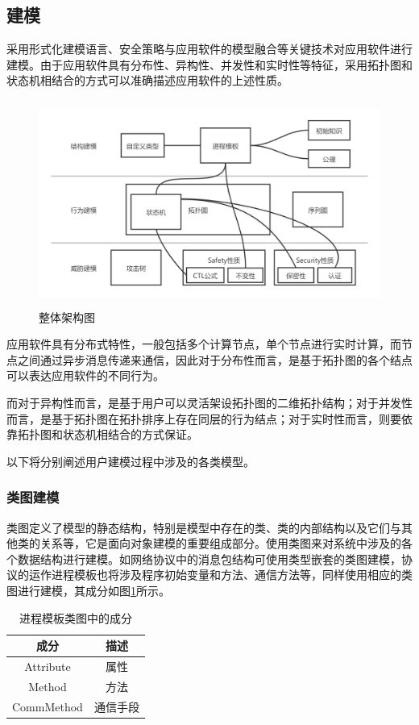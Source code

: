 \subsection{建模}
采用形式化建模语言、安全策略与应用软件的模型融合等关键技术对应用软件进行建模。由于应用软件具有分布性、异构性、并发性和实时性等特征，采用拓扑图和状态机相结合的方式可以准确描述应用软件的上述性质。
\par
\begin{figure}[h]
	\centering
	\includegraphics[width=12cm,height=6.75cm]{imgs/architecture.png}
	\caption{整体架构图}
	\label{architecture}
\end{figure}
\par
应用软件具有分布式特性，一般包括多个计算节点，单个节点进行实时计算，而节点之间通过异步消息传递来通信，因此对于分布性而言，是基于拓扑图的各个结点可以表达应用软件的不同行为。
\par
而对于异构性而言，是基于用户可以灵活架设拓扑图的二维拓扑结构；对于并发性而言，是基于拓扑图在拓扑排序上存在同层的行为结点；对于实时性而言，则要依靠拓扑图和状态机相结合的方式保证。
\par
以下将分别阐述用户建模过程中涉及的各类模型。

\subsubsection{类图建模}
类图定义了模型的静态结构，特别是模型中存在的类、类的内部结构以及它们与其他类的关系等，它是面向对象建模的重要组成部分。使用类图来对系统中涉及的各个数据结构进行建模。如网络协议中的消息包结构可使用类型嵌套的类图建模，协议的运作进程模板也将涉及程序初始变量和方法、通信方法等，同样使用相应的类图进行建模，其成分如图\ref{process}所示。
\begin{table}[h]
	\centering
	\begin{tabular}{|c|c|}
		\hline
		\textbf{成分} & \textbf{描述} \\ \hline
		Attribute           & 属性          \\ \hline
		Method              & 方法          \\ \hline
		CommMethod          & 通信手段        \\ \hline
	\end{tabular}
	\caption{进程模板类图中的成分}
	\label{process}
\end{table}

